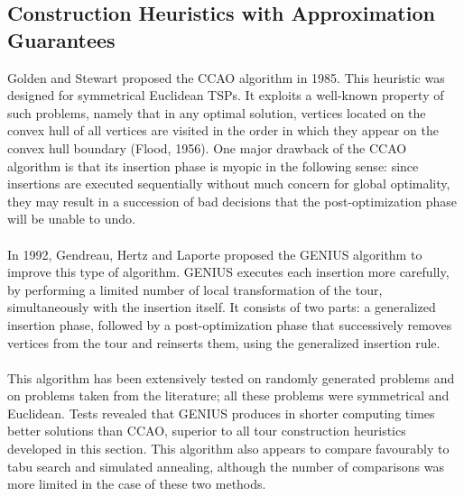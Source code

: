 \subsection{Construction Heuristics with Approximation Guarantees}
Golden and Stewart proposed the CCAO algorithm in 1985. This heuristic was designed for symmetrical Euclidean TSPs. It exploits a well-known property of such problems, namely that in any optimal solution, vertices located on the convex hull of all vertices are visited in the order in which they
appear on the convex hull boundary (Flood, 1956). One major drawback of the CCAO algorithm is that its insertion phase is myopic in the following sense: since insertions are executed sequentially without much concern for global optimality, they may result in a succession of bad decisions that the post-optimization phase will be unable to undo.\\
\\
In 1992, Gendreau, Hertz and Laporte proposed the GENIUS algorithm to improve this type of algorithm. GENIUS executes each insertion more carefully, by performing a limited number of local transformation of the tour, simultaneously with the insertion itself. It consists of two parts: a generalized insertion phase, followed by a post-optimization phase that successively removes vertices from the tour and reinserts them, using the generalized insertion rule.\\
\\
This algorithm has been extensively tested on randomly generated problems and on problems taken from the literature; all these problems were symmetrical and Euclidean. Tests revealed that GENIUS produces in shorter computing times
better solutions than CCAO, superior to all tour construction heuristics developed in this section. This algorithm also appears to compare favourably to tabu search and simulated annealing, although the number of comparisons was more limited in the case of these two methods.

